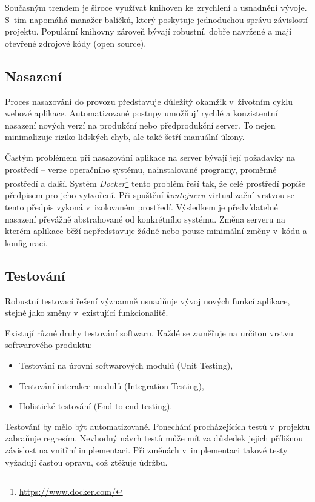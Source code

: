 Současným trendem je široce využívat knihoven ke~zrychlení a usnadnění vývoje.
S~tím napomáhá manažer balíčků, který poskytuje jednoduchou správu závislostí projektu.
Populární knihovny zároveň bývají robustní, dobře navržené a mají otevřené zdrojové kódy (open source).

\subsection{Nasazení}

Proces nasazování do provozu představuje důležitý okamžik v~životním cyklu webové aplikace.
Automatizované postupy umožňují rychlé a konzistentní nasazení nových verzí na produkční nebo předprodukční server.
To nejen minimalizuje riziko lidských chyb, ale také šetří manuální úkony.

Častým problémem při nasazování aplikace na server bývají její požadavky na prostředí -- verze operačního systému, nainstalované programy, proměnné prostředí a další.
Systém \emph{Docker}\footnote{\url{https://www.docker.com/}} tento problém řeší tak, že celé prostředí popíše předpisem pro jeho vytvoření. \cite{Dhakad2023AdoptingCI}
Při spuštění \emph{kontejneru} virtualizační vrstvou se tento předpis vykoná v~izolovaném prostředí.
Výsledkem je předvídatelné nasazení převážně abstrahované od konkrétního systému.
Změna serveru na kterém aplikace běží nepředstavuje žádné nebo pouze minimální změny v~kódu a konfiguraci. 

\subsection{Testování}

Robustní testovací řešení významně usnadňuje vývoj nových funkcí aplikace, stejně jako změny v~existující funkcionalitě.

Existují různé druhy testování softwaru.
Každé se zaměřuje na určitou vrstvu softwarového produktu:
\begin{itemize}
    \item Testování na úrovni softwarových modulů (Unit Testing),
    \item Testování interakce modulů (Integration Testing),
    \item Holistické testování (End-to-end testing).
\end{itemize}

Testování by mělo být automatizované.
Ponechání procházejících testů v~projektu zabraňuje regresím.
Nevhodný návrh testů může mít za důsledek jejich přílišnou závislost na vnitřní implementaci.
Při změnách v~implementaci takové testy vyžadují častou opravu, což ztěžuje údržbu.

